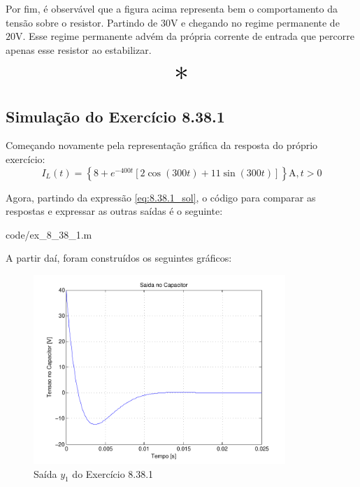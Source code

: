 \documentclass{report}
\begin{document}
Por fim, é observável que a figura acima representa bem o comportamento da tensão sobre o resistor. Partindo de $ 30\text{V} $ e chegando no regime
permanente de $ 20 \text{V} $. Esse regime permanente advém da própria corrente de entrada que percorre apenas esse resistor ao estabilizar.

\begin{center}
    \[ \scalebox{3}{$ * $} \]
\end{center}

\subsection{Simulação do Exercício 8.38.1}
Começando novamente pela representação gráfica da resposta do próprio exercício:
$$ I_L(t) = \left\{8 + e^{-400t}\left[2\cos(300t) + 11\sin(300t)\right]\right\}\text{A}, t > 0 $$

Agora, partindo da expressão \ref{eq:8.38.1_sol}, o código para comparar as respostas e expressar as outras saídas é o seguinte:

                {code/ex_8_38_1.m}

A partir daí, foram construídos os seguintes gráficos:
\begin{figure}[h!]
    \centering
    \includegraphics[width=0.85\textwidth]{images/plots/plot_8_38_1_y1.pdf}
    \caption{\label{plot:8.38.1_y1} Saída $ y_1 $ do Exercício 8.38.1}
\end{figure}
\end{document}
